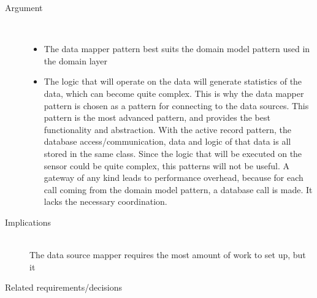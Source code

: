 \begin{description}
\item [Argument]~\\
\begin{itemize}
\item The data mapper pattern best suits the domain model pattern used in the domain layer
\item The logic that will operate on the data will generate statistics of the data, which can become quite complex. This is why the data mapper pattern is chosen as a pattern for connecting to the data sources. This pattern is the most advanced pattern, and provides the best functionality and abstraction.
With the active record pattern, the database access/communication, data and logic of that data is all stored in the same class. Since the logic that will be executed on the sensor could be quite complex, this patterns will not be useful.
A gateway of any kind leads to performance overhead, because for each call coming from the domain model pattern, a database call is made. It lacks the necessary coordination.
\end{itemize}


\item [Implications]~\\
The data source mapper requires the most amount of work to set up, but it 

\item [Related requirements/decisions]~\\
\end{description}
%
